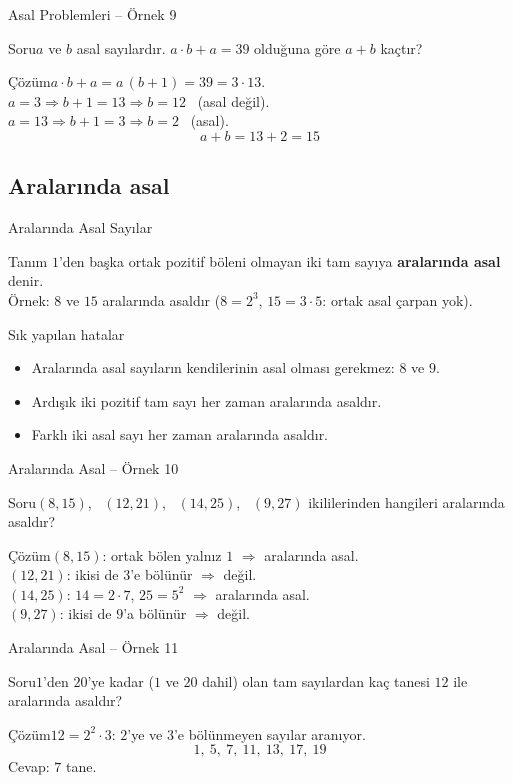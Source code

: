 \documentclass[aspectratio=169,11pt,handout]{beamer}
\newcommand{\soru}[3]{%
\begin{frame}{#1}
  \begin{block}{Soru}\large #2\end{block}
  \pause
  \begin{exampleblock}{Çözüm}\large #3\end{exampleblock}
\end{frame}}
\begin{document}
\soru{Asal Problemleri -- Örnek 9}
{\(a\) ve \(b\) asal sayılardır. \(a\cdot b+a=39\) olduğuna göre \(a+b\) kaçtır?}
{\(a\cdot b+a=a\,(b+1)=39=3\cdot 13\).\\[3pt]
\(a=3\Rightarrow b+1=13\Rightarrow b=12\) \ (asal değil).\\
\(a=13\Rightarrow b+1=3\Rightarrow b=2\) \ (asal).
\[a+b=13+2=15\]}

\subsection{Aralarında asal}
\begin{frame}{Aralarında Asal Sayılar}
\begin{block}{Tanım}
\(1\)'den başka ortak pozitif böleni olmayan iki tam sayıya \textbf{aralarında asal} denir.\\
Örnek: \(8\) ve \(15\) aralarında asaldır (\(8=2^3\), \(15=3\cdot 5\): ortak asal çarpan yok).
\end{block}
\begin{alertblock}{Sık yapılan hatalar}
\begin{itemize}
\item Aralarında asal sayıların kendilerinin asal olması gerekmez: \(8\) ve \(9\).
\item Ardışık iki pozitif tam sayı her zaman aralarında asaldır.
\item Farklı iki asal sayı her zaman aralarında asaldır.
\end{itemize}
\end{alertblock}
\end{frame}

\soru{Aralarında Asal -- Örnek 10}
{\((8,15)\), \ \((12,21)\), \ \((14,25)\), \ \((9,27)\) ikililerinden hangileri aralarında asaldır?}
{\((8,15)\): ortak bölen yalnız \(1\) \(\Rightarrow\) aralarında asal.\\
\((12,21)\): ikisi de \(3\)'e bölünür \(\Rightarrow\) değil.\\
\((14,25)\): \(14=2\cdot 7\), \(25=5^2\) \(\Rightarrow\) aralarında asal.\\
\((9,27)\): ikisi de \(9\)'a bölünür \(\Rightarrow\) değil.}

\soru{Aralarında Asal -- Örnek 11}
{\(1\)'den \(20\)'ye kadar (\(1\) ve \(20\) dahil) olan tam sayılardan kaç tanesi \(12\) ile aralarında asaldır?}
{\(12=2^2\cdot 3\): \(2\)'ye ve \(3\)'e bölünmeyen sayılar aranıyor.
\[1,\ 5,\ 7,\ 11,\ 13,\ 17,\ 19\]
Cevap: \(7\) tane.}
\end{document}
